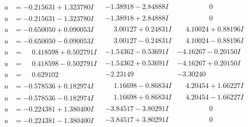\documentclass[1p]{elsarticle_modified}
\theoremstyle{definition}
\begin{document}
$$\begin{array}{c|c|c}
\begin{aligned}
u &= -0.215631 + 1.323780 I\end{aligned}
 & -1.38918 - 2.84888 I & \phantom{-0.000000 } 0 \\ \hline\begin{aligned}
u &= -0.215631 - 1.323780 I\end{aligned}
 & -1.38918 + 2.84888 I & \phantom{-0.000000 } 0 \\ \hline\begin{aligned}
u &= -0.650050 + 0.090053 I\end{aligned}
 & \phantom{-}3.00127 + 0.24831 I & \phantom{-}4.10024 + 0.88196 I \\ \hline\begin{aligned}
u &= -0.650050 - 0.090053 I\end{aligned}
 & \phantom{-}3.00127 - 0.24831 I & \phantom{-}4.10024 - 0.88196 I \\ \hline\begin{aligned}
u &= \phantom{-}0.418598 + 0.502791 I\end{aligned}
 & -1.54362 - 0.53691 I & -4.16267 - 0.20150 I \\ \hline\begin{aligned}
u &= \phantom{-}0.418598 - 0.502791 I\end{aligned}
 & -1.54362 + 0.53691 I & -4.16267 + 0.20150 I \\ \hline\begin{aligned}
u &= \phantom{-}0.629102\phantom{ +0.000000I}\end{aligned}
 & -2.23149\phantom{ +0.000000I} & -3.30240\phantom{ +0.000000I} \\ \hline\begin{aligned}
u &= -0.578536 + 0.182974 I\end{aligned}
 & \phantom{-}1.16698 - 0.86834 I & \phantom{-}4.20454 + 1.66227 I \\ \hline\begin{aligned}
u &= -0.578536 - 0.182974 I\end{aligned}
 & \phantom{-}1.16698 + 0.86834 I & \phantom{-}4.20454 - 1.66227 I \\ \hline\begin{aligned}
u &= -0.224381 + 1.380400 I\end{aligned}
 & -3.84517 - 3.80291 I & \phantom{-0.000000 } 0 \\ \hline\begin{aligned}
u &= -0.224381 - 1.380400 I\end{aligned}
 & -3.84517 + 3.80291 I & \phantom{-0.000000 } 0 \\ \hline\begin{aligned}

\end{aligned}
\end{array}$$
\end{document}
